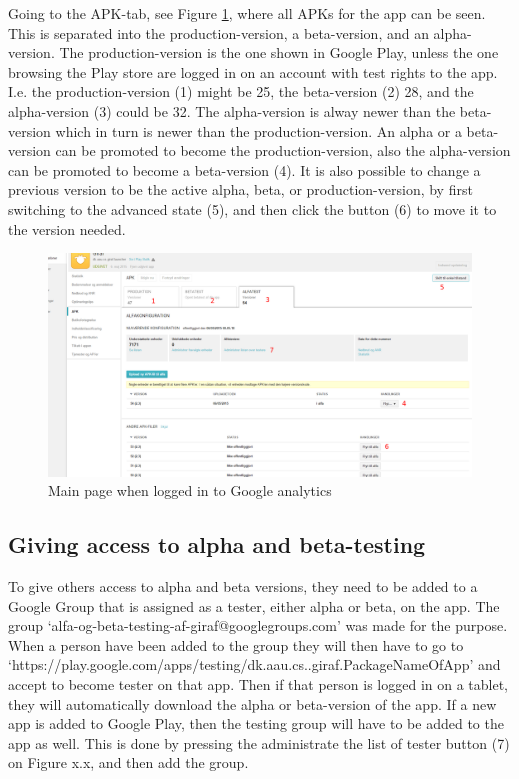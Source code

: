 Going to the APK-tab, see Figure \ref{VersionHandlingGooglePlay}, where all APKs for the app can be seen. This is separated into the production-version, a beta-version, and an alpha-version. The production-version is the one shown in Google Play, unless the one browsing the Play store are logged in on an account with test rights to the app. I.e. the production-version (1) might be 25, the beta-version (2) 28, and the alpha-version (3) could be 32. The alpha-version is alway newer than the beta-version which in turn is newer than the production-version. An alpha or a beta-version can be promoted to become the production-version, also the alpha-version can be promoted to become a beta-version (4).
It is also possible to change a previous version to be the active alpha, beta, or production-version, by first switching to the advanced state (5), and then click the button (6) to move it to the version needed.

\begin{figure}[H]
	\centering
	\includegraphics[width=0.8 \textwidth]{pictures/VersionHandlingGooglePlay.png}
	\caption{Main page when logged in to Google analytics}
	\label{VersionHandlingGooglePlay}
\end{figure}

\subsection{Giving access to alpha and beta-testing}
To give others access to alpha and beta versions, they need to be added to a Google Group that is assigned as a tester, either alpha or beta, on the app. The group ‘alfa-og-beta-testing-af-giraf@googlegroups.com’ was made for the purpose. When a person have been added to the group they will then have to go to ‘https://play.google.com/apps/testing/dk.aau.cs..giraf.PackageNameOfApp’ and accept to become tester on that app. Then if that person is logged in on a tablet, they will automatically download the alpha or beta-version of the app.
If a new app is added to Google Play, then the testing group will have to be added to the app as well. This is done by pressing the administrate the list of tester button (7) on Figure x.x, and then add the group.

